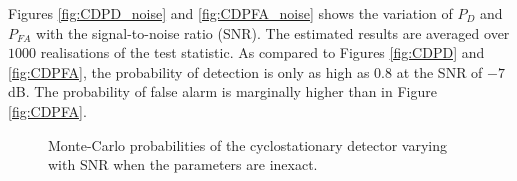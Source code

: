\documentclass[11pt]{article}
\begin{document}
Figures \ref{fig:CDPD_noise} and \ref{fig:CDPFA_noise} shows the variation of $P_{D}$ and $P_{FA}$ with the signal-to-noise ratio (SNR). The estimated results are averaged over $1000$ realisations of the test statistic. As compared to Figures \ref{fig:CDPD} and \ref{fig:CDPFA}, the probability of detection is only as high as $0.8$ at the SNR of $-7$dB. The probability of false alarm is marginally higher than in Figure \ref{fig:CDPFA}.
\begin{figure}[h]
\centering
{}
\caption{Monte-Carlo probabilities of the cyclostationary detector varying with SNR when the parameters are inexact.}
\label{fig:CD_inexact}
\end{figure}


\end{document}
